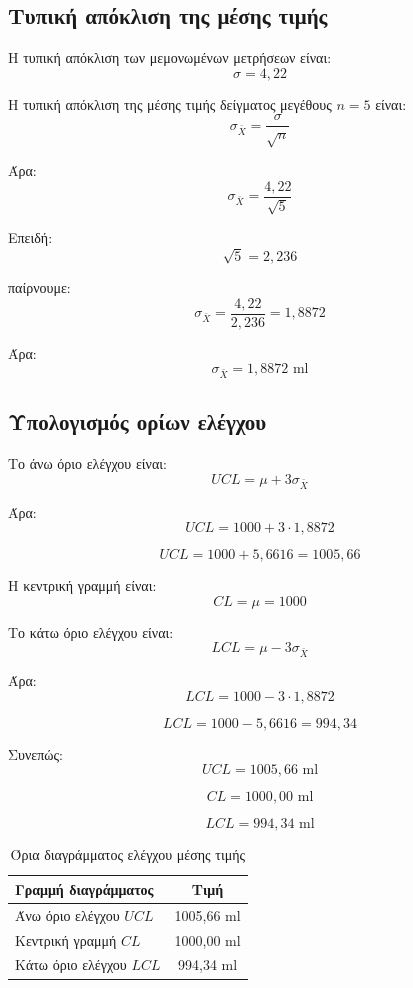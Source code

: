 \documentclass[12pt,a4paper]{article}
\begin{document}
\subsection{Τυπική απόκλιση της μέσης τιμής}

Η τυπική απόκλιση των μεμονωμένων μετρήσεων είναι:
\[
\sigma=4{,}22
\]

Η τυπική απόκλιση της μέσης τιμής δείγματος μεγέθους \(n=5\) είναι:
\[
\sigma_{\bar{X}}=\frac{\sigma}{\sqrt{n}}
\]

Άρα:
\[
\sigma_{\bar{X}}=\frac{4{,}22}{\sqrt{5}}
\]

Επειδή:
\[
\sqrt{5}=2{,}236
\]

παίρνουμε:
\[
\sigma_{\bar{X}}=\frac{4{,}22}{2{,}236}=1{,}8872
\]

Άρα:
\[
\boxed{\sigma_{\bar{X}}=1{,}8872 \text{ ml}}
\]

\subsection{Υπολογισμός ορίων ελέγχου}

Το άνω όριο ελέγχου είναι:
\[
UCL=\mu+3\sigma_{\bar{X}}
\]

Άρα:
\[
UCL=1000+3\cdot1{,}8872
\]

\[
UCL=1000+5{,}6616=1005{,}66
\]

Η κεντρική γραμμή είναι:
\[
CL=\mu=1000
\]

Το κάτω όριο ελέγχου είναι:
\[
LCL=\mu-3\sigma_{\bar{X}}
\]

Άρα:
\[
LCL=1000-3\cdot1{,}8872
\]

\[
LCL=1000-5{,}6616=994{,}34
\]

Συνεπώς:
\[
\boxed{UCL=1005{,}66 \text{ ml}}
\]

\[
\boxed{CL=1000{,}00 \text{ ml}}
\]

\[
\boxed{LCL=994{,}34 \text{ ml}}
\]

\begin{table}[H]
\centering
\caption{Όρια διαγράμματος ελέγχου μέσης τιμής}
\begin{tabular}{lc}
\toprule
\textbf{Γραμμή διαγράμματος} & \textbf{Τιμή} \\
\midrule
Άνω όριο ελέγχου \(UCL\) & 1005,66 ml \\
Κεντρική γραμμή \(CL\) & 1000,00 ml \\
Κάτω όριο ελέγχου \(LCL\) & 994,34 ml \\
\bottomrule
\end{tabular}
\end{table}
\end{document}
